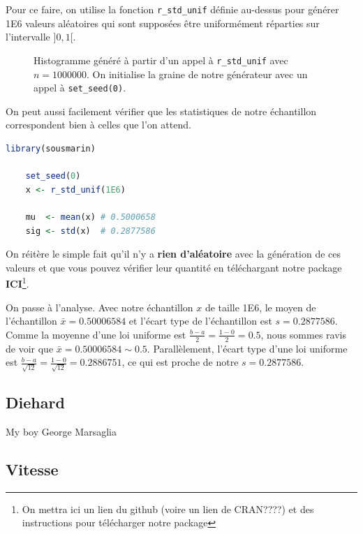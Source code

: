 \documentclass[10pt]{article} %
\begin{document}
Pour ce faire, on utilise la fonction \texttt{r\_std\_unif} définie au-dessus pour générer 1E6 valeurs aléatoires qui sont supposées être uniformément
réparties sur l'intervalle ]$0, 1$[.

\begin{figure}[h!]
    \centering
    

    \vspace{-1cm}
    \caption{Histogramme généré à partir d'un appel à \texttt{r\_std\_unif} avec $n = 1000000$. On initialise la graine de notre
    générateur avec un appel à \texttt{set\_seed(0)}.}

\end{figure}

On peut aussi facilement vérifier que les statistiques de notre échantillon correspondent bien à celles que l'on attend.

\begin{lstlisting}[language=R]
    library(sousmarin)

    set_seed(0)
    x <- r_std_unif(1E6)

    mu  <- mean(x) # 0.5000658
    sig <- std(x)  # 0.2877586
\end{lstlisting}

On réitère le simple fait qu'il n'y a \textbf{rien d'aléatoire} avec la génération de ces valeurs et que vous pouvez vérifier leur quantité en
téléchargant notre package \textbf{ICI}\footnote{On mettra ici un lien du github (voire un lien de CRAN????) et des instructions pour télécharger notre package}.

On passe à l'analyse. Avec notre échantillon $x$ de taille 1E6, le moyen de l'échantillon $\bar x = 0.50006584$ et l'écart type de l'échantillon est $s = 0.2877586$.
Comme la moyenne d'une loi uniforme est $\frac{b - a}{2} = \frac{1 - 0}{2} = 0.5$, nous sommes ravis de voir que $\bar x = 0.50006584 \sim 0.5$. Parallèlement, l'écart type
d'une loi uniforme est $\frac{b - a}{\sqrt{12}} = \frac{1 - 0}{\sqrt{12}} = 0.2886751$, ce qui est proche de notre $s = 0.2877586$.

\subsection{Diehard}

My boy George Marsaglia

\subsection{Vitesse}
\end{document}
